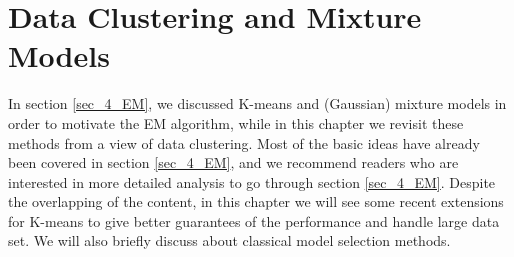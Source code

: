 \documentclass[../book-template.tex]{subfiles}
\begin{document}
\chapter{Data Clustering and Mixture Models}

In section \ref{sec_4_EM}, we discussed K-means and (Gaussian) mixture models in order to motivate the EM algorithm, while in this chapter we revisit these methods from a view of data clustering. Most of the basic ideas have already been covered in section \ref{sec_4_EM}, and we recommend readers who are interested in more detailed analysis to go through section \ref{sec_4_EM}. Despite the overlapping of the content, in this chapter we will see some recent extensions for K-means to give better guarantees of the performance and handle large data set. We will also briefly discuss about classical model selection methods.
\end{document}

